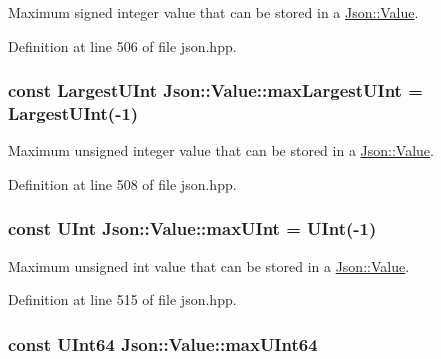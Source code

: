 Maximum signed integer value that can be stored in a \hyperlink{class_json_1_1_value}{Json\-::\-Value}. 



Definition at line 506 of file json.\-hpp.

\hypertarget{class_json_1_1_value_a8ddb32d9d55fa5323ae5135639dc2e31}{
\subsubsection[{max\-Largest\-U\-Int}]{\setlength{\rightskip}{0pt plus 5cm}const {\bf Largest\-U\-Int} Json\-::\-Value\-::max\-Largest\-U\-Int = {\bf Largest\-U\-Int}(-\/1)\hspace{0.3cm}{\ttfamily [static]}}}\label{class_json_1_1_value_a8ddb32d9d55fa5323ae5135639dc2e31}


Maximum unsigned integer value that can be stored in a \hyperlink{class_json_1_1_value}{Json\-::\-Value}. 



Definition at line 508 of file json.\-hpp.

\hypertarget{class_json_1_1_value_ac79e63ee68d3aa914bfd6988be669b87}{
\subsubsection[{max\-U\-Int}]{\setlength{\rightskip}{0pt plus 5cm}const {\bf U\-Int} Json\-::\-Value\-::max\-U\-Int = {\bf U\-Int}(-\/1)\hspace{0.3cm}{\ttfamily [static]}}}\label{class_json_1_1_value_ac79e63ee68d3aa914bfd6988be669b87}


Maximum unsigned int value that can be stored in a \hyperlink{class_json_1_1_value}{Json\-::\-Value}. 



Definition at line 515 of file json.\-hpp.

\hypertarget{class_json_1_1_value_ae1eb89c305c39516696ff305cffa01da}{
\subsubsection[{max\-U\-Int64}]{\setlength{\rightskip}{0pt plus 5cm}const {\bf U\-Int64} Json\-::\-Value\-::max\-U\-Int64\hspace{0.3cm}{\ttfamily [static]}}}\label{class_json_1_1_value_ae1eb89c305c39516696ff305cffa01da}


